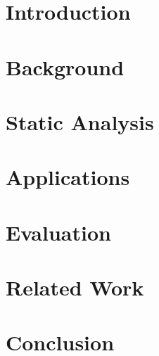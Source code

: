 \documentclass[12pt,a4paper]{report}
\begin{document}



\blankpage



\afterpage{\blankpage}



\afterpage{\blankpage}

\tableofcontents
\listoffigures

\clearpage


\chapter{Introduction}



\chapter{Background}



\chapter{Static Analysis}



\chapter{Applications}



\chapter{Evaluation}



\chapter{Related Work}



\chapter{Conclusion}



\printbibliography
\end{document}

